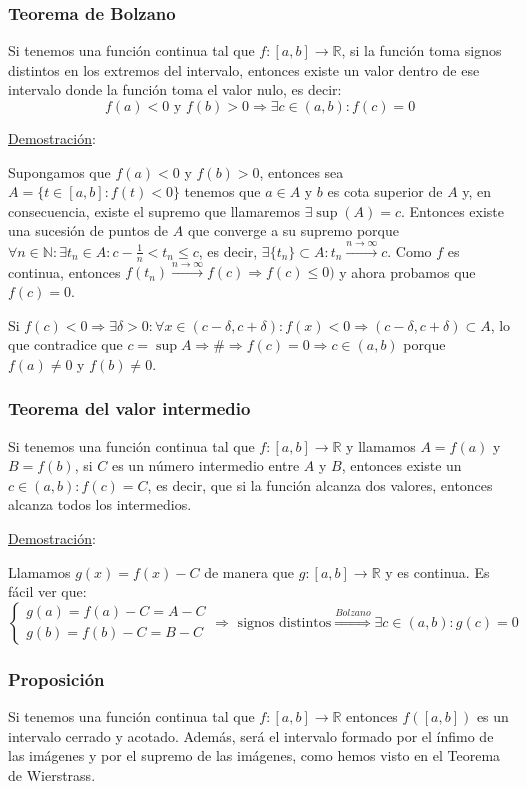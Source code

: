 \documentclass[10pt,a4paper,openright]{book}
\begin{document}
\subsubsection*{Teorema de Bolzano}
Si tenemos una función continua tal que $f:[a,b] \rightarrow \mathbb R$, si la función toma signos distintos en los extremos del intervalo, entonces existe un valor dentro de ese intervalo donde la función toma el valor nulo, es decir:
$$f(a)<0 \mbox{ y } f(b)>0\Rightarrow \exists c\in (a,b): f(c)=0$$

\underline{Demostración}:\par
Supongamos que $f(a)<0$ y $f(b)>0$, entonces sea $A=\{t\in [a,b]: f(t)<0\}$ tenemos que $a\in A$ y $b$ es cota superior de $A$ y, en consecuencia, existe el supremo que llamaremos $\exists \sup(A)=c$. Entonces existe una sucesión de puntos de $A$ que converge a su supremo porque $\forall n\in \mathbb N: \exists t_n\in A: c-\frac{1}{n}< t_n\leq c$, es decir, $\exists\{t_n\}\subset A: t_n\xrightarrow{n\rightarrow \infty}c$. Como $f$ es continua, entonces $f(t_n)\xrightarrow{n\rightarrow \infty}f(c)\Rightarrow f(c)\leq 0)$ y ahora probamos que $f(c)=0$.\par
Si $f(c)<0\Rightarrow \exists\delta>0: \forall x\in (c-\delta, c+\delta): f(x)<0\Rightarrow (c-\delta, c+\delta)\subset A$, lo que contradice que $c=\sup A\Rightarrow \#\Rightarrow f(c)=0\Rightarrow c\in (a,b)$ porque $f(a)\neq 0$ y $f(b)\neq 0$.

\subsubsection*{Teorema del valor intermedio}
Si tenemos una función continua tal que $f:[a,b] \rightarrow \mathbb R$ y llamamos $A=f(a)$ y $B=f(b)$, si $C$ es un número intermedio entre $A$ y $B$, entonces existe un $c\in(a,b): f(c)=C$, es decir, que si la función alcanza dos valores, entonces alcanza todos los intermedios.

\underline{Demostración}:\par
Llamamos $g(x)=f(x)-C$ de manera que $g:[a,b] \rightarrow \mathbb R$ y es continua. Es fácil ver que:
$$\begin{cases}g(a)=f(a)-C=A-C \\ 
g(b)=f(b)-C=B-C \end{cases} \Rightarrow \mbox{ signos distintos}\stackrel{Bolzano}{\Rightarrow} \exists c\in (a,b): g(c)=0$$

\subsubsection*{Proposición}
Si tenemos una función continua tal que $f:[a,b] \rightarrow \mathbb R$ entonces $f([a,b])$ es un intervalo cerrado y acotado. Además, será el intervalo formado por el ínfimo de las imágenes y por el supremo de las imágenes, como hemos visto en el Teorema de Wierstrass.
\end{document}
